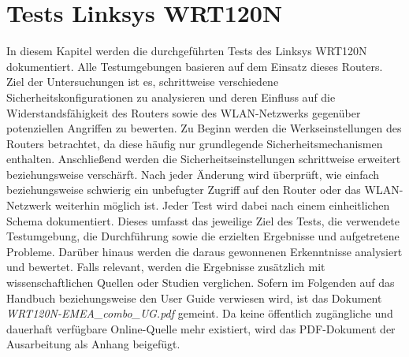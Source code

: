 	\chapter{Tests Linksys WRT120N}
	\label{sec:tests_wrt120n}
	In diesem Kapitel werden die durchgeführten Tests des Linksys WRT120N dokumentiert.
	Alle Testumgebungen basieren auf dem Einsatz dieses Routers. Ziel der Untersuchungen
	ist es, schrittweise verschiedene Sicherheitskonfigurationen zu analysieren und
	deren Einfluss auf die Widerstandsfähigkeit des Routers sowie des WLAN-Netzwerks 
	gegenüber potenziellen Angriffen zu bewerten.
	Zu Beginn werden die Werkseinstellungen des Routers betrachtet, da diese häufig 
	nur grundlegende Sicherheitsmechanismen enthalten. Anschließend werden die 
	Sicherheitseinstellungen schrittweise erweitert beziehungsweise verschärft. Nach
	jeder Änderung wird überprüft, wie einfach beziehungsweise schwierig ein unbefugter
	Zugriff auf den Router oder das WLAN-Netzwerk weiterhin möglich ist.
	Jeder Test wird dabei nach einem einheitlichen Schema dokumentiert. Dieses umfasst
	das jeweilige Ziel des Tests, die verwendete Testumgebung, die Durchführung sowie 
	die erzielten Ergebnisse und aufgetretene Probleme. Darüber hinaus werden die daraus
	gewonnenen Erkenntnisse analysiert und bewertet. Falls relevant, werden die
	Ergebnisse zusätzlich mit wissenschaftlichen Quellen oder Studien verglichen.
	Sofern im Folgenden auf das Handbuch beziehungsweise den User Guide verwiesen wird, ist 
	das Dokument \emph{WRT120N-EMEA\_combo\_UG.pdf} gemeint. Da keine öffentlich
	zugängliche und dauerhaft verfügbare Online-Quelle mehr existiert, wird das 
	PDF-Dokument der Ausarbeitung als Anhang beigefügt.

